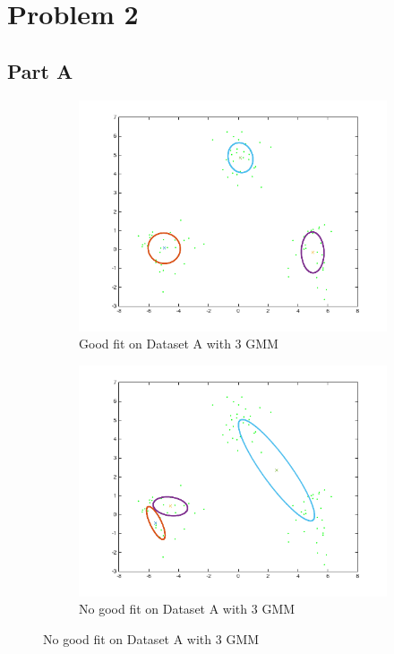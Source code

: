 \section*{Problem 2}
\subsection*{Part A}
\begin{figure}[ht]
\begin{subfigure}[b]{0.5\linewidth}
    \centering
    \includegraphics[width=0.75\linewidth]{figures/mixmodelA_3_20.png}
    \caption{Good fit on Dataset A with 3 GMM}
    \vspace{4ex}
  \end{subfigure}%
  \begin{subfigure}[b]{0.5\linewidth}
  \centering
\includegraphics[width=0.75\linewidth]{figures/mixmodelA_3_500.png}
\caption{No good fit on Dataset A with 3 GMM}
\vspace{4ex}
\end{subfigure}%
\end{figure}
%
